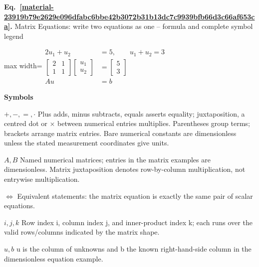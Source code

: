 \documentclass[11pt,a4paper]{article}
\begin{document}
\par\medskip
\noindent\begin{minipage}{\linewidth}
\label{material-23919b79e2629e096dfabc6bbe42b3072b31b13dc7c9939bfb66d3c66af653ca}
\noindent\textbf{Eq.~\ref*{material-23919b79e2629e096dfabc6bbe42b3072b31b13dc7c9939bfb66d3c66af653ca}.} Matrix Equations: write two equations as one – formula and complete symbol legend\par\nopagebreak
\begin{center}\begin{adjustbox}{max width=\linewidth}$\displaystyle \begin{aligned}2u_1+u_2&=5,\qquad u_1+u_2=3\\\begin{bmatrix}2&1\\1&1\end{bmatrix}\begin{bmatrix}u_1\\u_2\end{bmatrix}&=\begin{bmatrix}5\\3\end{bmatrix}\\Au&=b\end{aligned}$\end{adjustbox}\end{center}

\par\noindent\textbf{Symbols}

\par\noindent\textbf{\(+,-,=,\cdot\)} Plus adds, minus subtracts, equals asserts equality; juxtaposition, a centred dot or \ensuremath{\times} between numerical entries multiplies. Parentheses group terms; brackets arrange matrix entries. Bare numerical constants are dimensionless unless the stated measurement coordinates give units.

\par\noindent\textbf{\(A,B\)} Named numerical matrices; entries in the matrix examples are dimensionless. Matrix juxtaposition denotes row-by-column multiplication, not entrywise multiplication.

\par\noindent\textbf{\(\Longleftrightarrow\)} Equivalent statements: the matrix equation is exactly the same pair of scalar equations.

\par\noindent\textbf{\(i,j,k\)} Row index i, column index j, and inner-product index k; each runs over the valid rows/columns indicated by the matrix shape.

\par\noindent\textbf{\(u,b\)} u is the column of unknowns and b the known right-hand-side column in the dimensionless equation example.

\end{minipage}\par
\medskip
\end{document}

